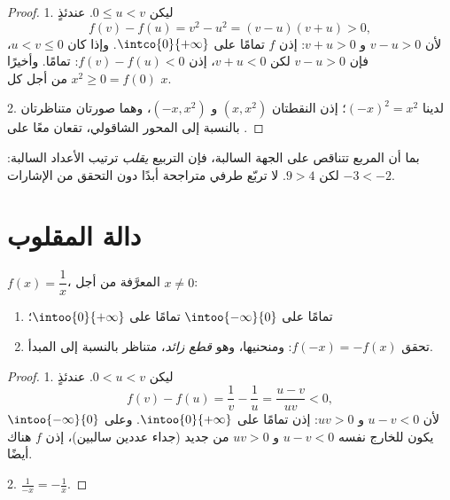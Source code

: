 \begin{proof}
1. ليكن $0 \leq u < v$. عندئذٍ
\[
f(v) - f(u) = v^2 - u^2 = (v - u)(v + u) > 0,
\]
لأن $v - u > 0$ و $v + u > 0$: إذن $f$  تمامًا على
$\intco{0}{+\infty}$. وإذا كان $u < v \leq 0$، فإن $v - u > 0$ لكن
$v + u < 0$، إذن $f(v) - f(u) < 0$:  تمامًا. وأخيرًا
$x^2 \geq 0 = f(0)$ من أجل كل $x$.

2. لدينا $(-x)^2 = x^2$؛ إذن النقطتان $(x, x^2)$ و $(-x, x^2)$، وهما صورتان
متناظرتان بالنسبة إلى المحور الشاقولي، تقعان معًا على .
\end{proof}

\begin{remark}
بما أن  المربع تتناقص على الجهة السالبة، فإن التربيع
\emph{يقلب} ترتيب الأعداد السالبة: $-3 < -2$ لكن $9 > 4$.
لا تربّع طرفي متراجحة أبدًا دون التحقق من الإشارات.
\end{remark}

\section{دالة المقلوب}

\begin{proposition}\label{prop:g10:reffunc:inverse}
 $f(x) = \dfrac1x$، المعرَّفة من أجل $x \neq 0$:
\begin{enumerate}
  \item {} تمامًا على $\intoo{-\infty}{0}$ 
        تمامًا على $\intoo{0}{+\infty}$؛
  \item تحقق $f(-x) = -f(x)$: ومنحنيها، وهو
        \emph{قطع زائد}، متناظر بالنسبة إلى المبدأ.
\end{enumerate}
\end{proposition}

\begin{proof}
1. ليكن $0 < u < v$. عندئذٍ
\[
f(v) - f(u) = \frac1v - \frac1u = \frac{u - v}{uv} < 0,
\]
لأن $u - v < 0$ و $uv > 0$: إذن  تمامًا على
$\intoo{0}{+\infty}$. وعلى $\intoo{-\infty}{0}$ يكون للخارج نفسه
$u - v < 0$ و $uv > 0$ من جديد (جداء عددين سالبين)، إذن $f$
 هناك أيضًا.

2. $\frac{1}{-x} = -\frac1x$.
\end{proof}

